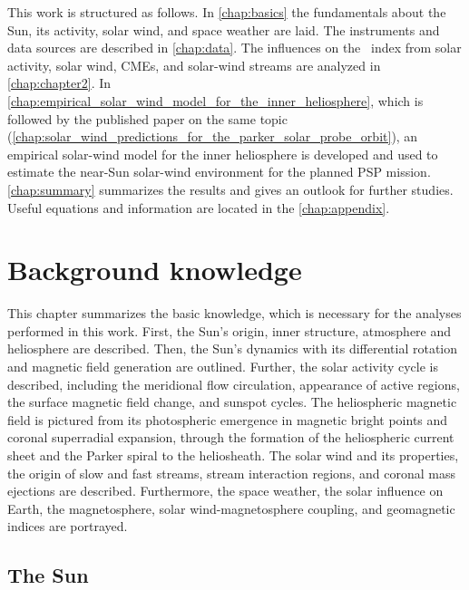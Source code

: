 This work is structured as follows. In \autoref{chap:basics} the fundamentals about the Sun, its activity, solar wind, and space weather are laid. The instruments and data sources are described in \autoref{chap:data}. The influences on the \Kp{}~index from solar activity, solar wind, CMEs, and solar-wind streams are analyzed in \autoref{chap:chapter2}. In \autoref{chap:empirical_solar_wind_model_for_the_inner_heliosphere}, which is followed by the published paper on the same topic (\autoref{chap:solar_wind_predictions_for_the_parker_solar_probe_orbit}), an empirical solar-wind model for the inner heliosphere is developed and used to estimate the near-Sun solar-wind environment for the planned PSP mission. \autoref{chap:summary} summarizes the results and gives an outlook for further studies. Useful equations and information are located in the \autoref{chap:appendix}.


\chapter{Background knowledge}
\label{chap:basics}
This chapter summarizes the basic knowledge, which is necessary for the analyses performed in this work. First, the Sun's origin, inner structure, atmosphere and heliosphere are described. Then, the Sun's dynamics with its differential rotation and magnetic field generation are outlined. Further, the solar activity cycle is described, including the meridional flow circulation, appearance of active regions, the surface magnetic field change, and sunspot cycles. The heliospheric magnetic field is pictured from its photospheric emergence in magnetic bright points and coronal superradial expansion, through the formation of the heliospheric current sheet and the Parker spiral to the heliosheath. The solar wind and its properties, the origin of slow and fast streams, stream interaction regions, and coronal mass ejections are described. Furthermore, the space weather, the solar influence on Earth, the magnetosphere, solar wind-magnetosphere coupling, and geomagnetic indices are portrayed.


\section{The Sun}
\label{sec:solar_composition}

